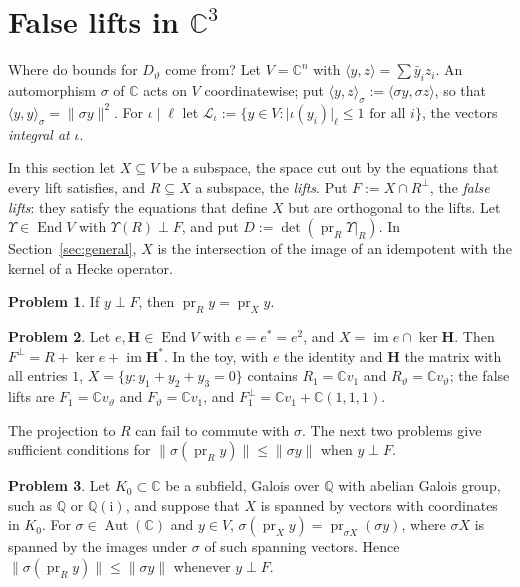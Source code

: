 \documentclass[reqno]{amsart}
\theoremstyle{definition}
\newtheorem{problem}{Problem}[section]
\theoremstyle{plain}
\theoremstyle{remark}
\newcommand{\Q}{{\mathbb{Q}}}
\newcommand{\C}{{\mathbb{C}}}
\newcommand{\Lc}{{\mathcal{L}}}
\newcommand{\Hb}{{\mathbf{H}}}
\newcommand{\pr}{\operatorname{pr}}
\newcommand{\im}{\operatorname{im}}
\newcommand{\End}{\operatorname{End}}
\newcommand{\Aut}{\operatorname{Aut}}
\begin{document}
\section{False lifts in \texorpdfstring{\(\C^3\)}{C3}}\label{sec:toy}

Where do bounds for \(D_\vartheta\) come from?  Let \(V = \C^n\) with \(\langle y, z\rangle = \sum \bar y_i z_i\).  An automorphism \(\sigma\) of \(\C\) acts on \(V\) coordinatewise; put \(\langle y, z\rangle_\sigma := \langle\sigma y, \sigma z\rangle\), so that \(\langle y, y\rangle_\sigma = \lVert\sigma y\rVert^2\).  For \(\iota \mid \ell\) let \(\Lc_\iota := \{y \in V : \lvert\iota(y_i)\rvert_\ell \le 1 \text{ for all } i\}\), the vectors \emph{integral at} \(\iota\).

In this section let \(X \subseteq V\) be a subspace, the space cut out by the equations that every lift satisfies, and \(R \subseteq X\) a subspace, the \emph{lifts}.  Put \(F := X \cap R^\perp\), the \emph{false lifts}: they satisfy the equations that define \(X\) but are orthogonal to the lifts.  Let \(\Upsilon \in \End V\) with \(\Upsilon(R) \perp F\), and put \(D := \det(\pr_R \Upsilon|_R)\).  In Section~\ref{sec:general}, \(X\) is the intersection of the image of an idempotent with the kernel of a Hecke operator.

\begin{problem}\label{pr:false}
If \(y \perp F\), then \(\pr_R y = \pr_X y\).
\end{problem}

\begin{problem}\label{pr:perp}
Let \(e, \Hb \in \End V\) with \(e = e^* = e^2\), and \(X = \im e \cap \ker \Hb\).  Then \(F^\perp = R + \ker e + \im \Hb^*\).  In the toy, with \(e\) the identity and \(\Hb\) the matrix with all entries \(1\), \(X = \{y : y_1 + y_2 + y_3 = 0\}\) contains \(R_1 = \C v_1\) and \(R_\vartheta = \C v_\vartheta\); the false lifts are \(F_1 = \C v_\vartheta\) and \(F_\vartheta = \C v_1\), and \(F_1^\perp = \C v_1 + \C(1,1,1)\).
\end{problem}

The projection to \(R\) can fail to commute with \(\sigma\).  The next two problems give sufficient conditions for \(\lVert\sigma(\pr_R y)\rVert \le \lVert\sigma y\rVert\) when \(y \perp F\).

\begin{problem}\label{pr:conj}
Let \(K_0 \subset \C\) be a subfield, Galois over \(\Q\) with abelian Galois group, such as \(\Q\) or \(\Q(\mathrm{i})\), and suppose that \(X\) is spanned by vectors with coordinates in \(K_0\).  For \(\sigma \in \Aut(\C)\) and \(y \in V\), \(\sigma(\pr_X y) = \pr_{\sigma X}(\sigma y)\), where \(\sigma X\) is spanned by the images under \(\sigma\) of such spanning vectors.  Hence \(\lVert\sigma(\pr_R y)\rVert \le \lVert\sigma y\rVert\) whenever \(y \perp F\).
\end{problem}
\end{document}
